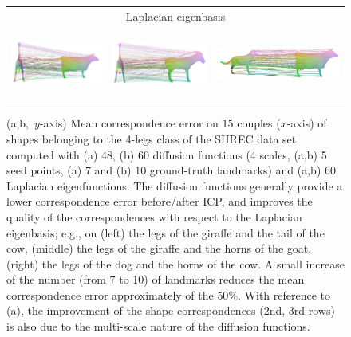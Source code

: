 \documentclass[acmtog,authorversion]{acmart}
\begin{document}
\begin{figure}
\begin{tabular}{ccc}
\hline
\multicolumn{3}{c}{Laplacian eigenbasis}\\
\includegraphics[height=65pt]{FMAP-images/4legs-Source=381-Target=390-Lapl-Eig-ZOOM.jpg}
&\includegraphics[height=65pt]{FMAP-images/4legs-Source=385-Target=390-Lapl-Eig-ZOOM.jpg}
&\includegraphics[height=50pt]{FMAP-images/4legs-Source=381-Target=398-Lapl-Eig-ZOOM.jpg}
\end{tabular}
\caption{(a,b,~$y$-axis) Mean correspondence error on 15 couples ($x$-axis) of shapes belonging to the 4-legs class of the SHREC data set computed with (a) 48, (b) 60 diffusion functions (4 scales, (a,b) 5 seed points, (a) 7 and (b) 10 ground-truth landmarks) and (a,b) 60 Laplacian eigenfunctions. The diffusion functions generally provide a lower correspondence error before/after ICP, and improves the quality of the correspondences with respect to the Laplacian eigenbasis; e.g., on (left) the legs of the giraffe and the tail of the cow, (middle) the legs of the giraffe and the horns of the goat, (right) the legs of the dog and the horns of the cow. A small increase of the number (from 7 to 10) of landmarks reduces the mean correspondence error approximately of the \mbox{$50\%$}. With reference to (a), the improvement of the shape correspondences (2nd, 3rd rows) is also due to the multi-scale nature of the diffusion functions.\label{fig:4LEGS-DIFFUSION-CORRESPONDENCES}}
\end{figure}
%
\end{document}
